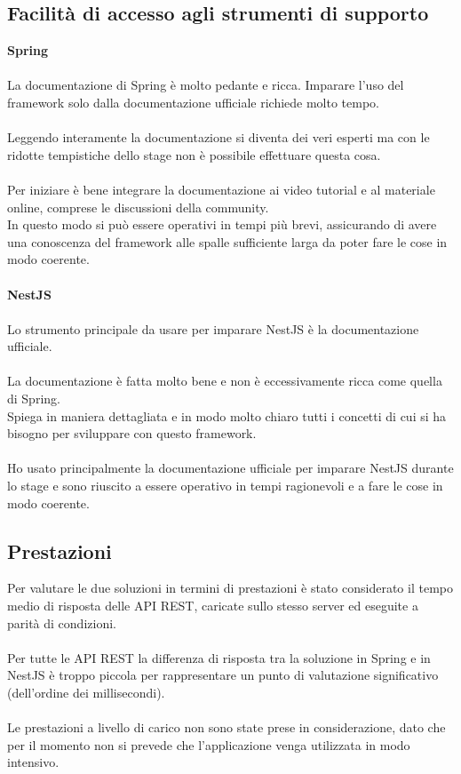 \subsection{Facilità di accesso agli strumenti di supporto}
\textbf{Spring}
\\\\
La documentazione di Spring è molto pedante e ricca. Imparare l'uso del framework solo dalla documentazione 
ufficiale richiede molto tempo. 
\\\\
Leggendo interamente la documentazione si diventa dei veri esperti ma con le ridotte tempistiche
dello stage non è possibile effettuare questa cosa.
\\\\
Per iniziare è bene integrare la documentazione ai video tutorial e al materiale online, comprese le discussioni 
della community. 
\\
In questo modo si può essere operativi in tempi più brevi, assicurando di avere una conoscenza
del framework alle spalle sufficiente larga da poter fare le cose in modo coerente.
\\\\
\textbf{NestJS}
\\\\
Lo strumento principale da usare per imparare NestJS è la documentazione ufficiale.
\\\\
La documentazione è fatta molto bene e non è eccessivamente ricca come quella di Spring. 
\\
Spiega in maniera dettagliata
e in modo molto chiaro tutti i concetti di cui si ha bisogno per sviluppare con questo framework.
\\\\
Ho usato principalmente la documentazione ufficiale per imparare NestJS durante lo stage e sono riuscito a essere
operativo in tempi ragionevoli e a fare le cose in modo coerente.

\subsection{Prestazioni}
Per valutare le due soluzioni in termini di prestazioni è stato considerato il tempo medio di risposta delle \gls{API} \gls{REST}, 
caricate sullo stesso 
server ed eseguite a parità di condizioni.
\\\\
Per tutte le \gls{API} \gls{REST} la differenza di risposta tra la soluzione in Spring e in NestJS è troppo piccola per rappresentare un punto
di valutazione significativo (dell'ordine dei millisecondi).
\\\\
Le prestazioni a livello di carico non sono state prese in considerazione, dato che per il momento non si prevede che l'applicazione 
venga utilizzata in modo intensivo.
